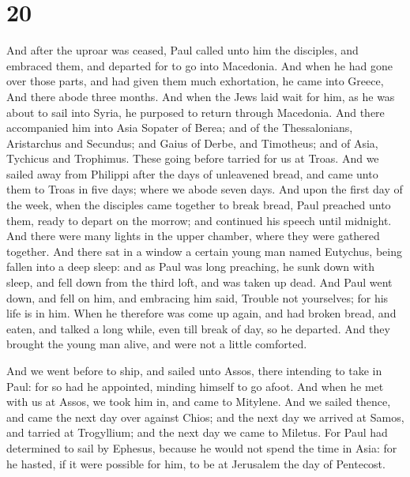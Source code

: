 \hypertarget{section-19}{%
\section{20}\label{section-19}}

 And after the uproar was ceased, Paul called unto him the
disciples, and embraced them, and departed for to go into Macedonia.
 And when he had gone over those parts, and had given them
much exhortation, he came into Greece,  And there abode
three months. And when the Jews laid wait for him, as he was about to
sail into Syria, he purposed to return through Macedonia. 
And there accompanied him into Asia Sopater of Berea; and of the
Thessalonians, Aristarchus and Secundus; and Gaius of Derbe, and
Timotheus; and of Asia, Tychicus and Trophimus.  These
going before tarried for us at Troas.  And we sailed away
from Philippi after the days of unleavened bread, and came unto them to
Troas in five days; where we abode seven days.  And upon
the first day of the week, when the disciples came together to break
bread, Paul preached unto them, ready to depart on the morrow; and
continued his speech until midnight.  And there were many
lights in the upper chamber, where they were gathered together.
 And there sat in a window a certain young man named
Eutychus, being fallen into a deep sleep: and as Paul was long
preaching, he sunk down with sleep, and fell down from the third loft,
and was taken up dead.  And Paul went down, and fell on
him, and embracing him said, Trouble not yourselves; for his life is in
him.  When he therefore was come up again, and had broken
bread, and eaten, and talked a long while, even till break of day, so he
departed.  And they brought the young man alive, and were
not a little comforted.

 And we went before to ship, and sailed unto Assos, there
intending to take in Paul: for so had he appointed, minding himself to
go afoot.  And when he met with us at Assos, we took him
in, and came to Mitylene.  And we sailed thence, and came
the next day over against Chios; and the next day we arrived at Samos,
and tarried at Trogyllium; and the next day we came to Miletus.
 For Paul had determined to sail by Ephesus, because he
would not spend the time in Asia: for he hasted, if it were possible for
him, to be at Jerusalem the day of Pentecost.

